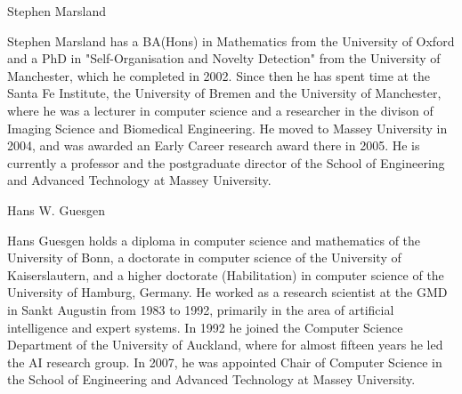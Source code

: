 \documentclass[10pt,journal,cspaper,compsoc]{IEEEtran}
\begin{document}
\begin{biography}{Stephen Marsland}

Stephen Marsland has a BA(Hons) in Mathematics from the University of Oxford and a PhD in "Self-Organisation and Novelty Detection" from the University of Manchester, which he completed in 2002. Since then he has spent time at the Santa Fe Institute, the University of Bremen and the University of Manchester, where he was a lecturer in computer science and a researcher in the divison of Imaging Science and Biomedical Engineering. He moved to Massey University in 2004, and was awarded an Early Career research award there in 2005. He is currently a professor and the postgraduate director of the School of Engineering and Advanced Technology at Massey University.
\end{biography}

\begin{biography}{Hans W. Guesgen}

Hans Guesgen holds a diploma in computer science and mathematics of the University of Bonn, a doctorate in computer science of the University of Kaiserslautern, and a higher doctorate (Habilitation) in computer science of the University of Hamburg, Germany. He worked as a research scientist at the GMD in Sankt Augustin from 1983 to 1992, primarily in the area of artificial intelligence and expert systems. 
In 1992 he joined the Computer Science Department of the University of Auckland, where for almost fifteen years he led the AI research group. %
In 2007, he was appointed Chair of Computer Science in the School of Engineering and Advanced Technology at Massey University.
\end{biography}
\end{document}
